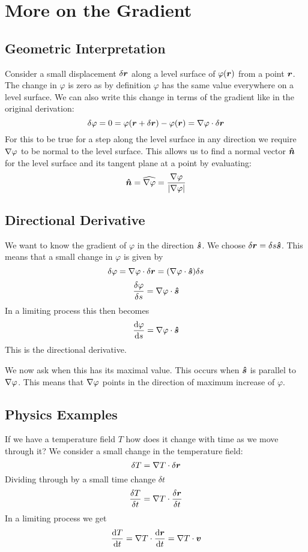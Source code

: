 \documentclass{article}
\begin{document}
    \section{More on the Gradient}
    \subsection{Geometric Interpretation}
    Consider a small displacement \(\delta\bm{r}\) along a level surface of \(\varphi(\bm{r})\) from a point \(\bm{r}\).
    The change in \(\varphi\) is zero as by definition \(\varphi\) has the same value everywhere on a level surface.
    We can also write this change in terms of the gradient like in the original derivation:
    \[\delta\varphi = 0 =\varphi(\bm{r} + \delta\bm{r}) - \varphi(\bm{r}) = \nabla\varphi\cdot\delta\bm{r}\]
    For this to be true for a step along the level surface in any direction we require \(\nabla\varphi\) to be normal to the level surface.
    This allows us to find a normal vector \(\bm{\hat{n}}\) for the level surface and its tangent plane at a point by evaluating:
    \[\bm{\hat{n}} = \widehat{\nabla\varphi} = \frac{\nabla\varphi}{|\nabla\varphi|}\]
    \subsection{Directional Derivative}
    We want to know the gradient of \(\varphi\) in the direction \(\bm{\hat{s}}\).
    We choose \(\delta\bm{r} = \delta s\bm{\hat{s}}\).
    This means that a small change in \(\varphi\) is given by
    \[\delta\varphi = \nabla\varphi\cdot\delta\bm{r} = (\nabla\varphi\cdot\bm{\hat{s}})\delta s\]
    \[\frac{\delta\varphi}{\delta s} = \nabla\varphi\cdot\bm{\hat{s}}\]
    In a limiting process this then becomes
    \[\dv{\varphi}{s} = \nabla{\varphi}\cdot\bm{\hat{s}}\]
    This is the directional derivative.
    
    We now ask when this has its maximal value.
    This occurs when \(\bm{\hat{s}}\) is parallel to \(\nabla\varphi\).
    This means that \(\nabla\varphi\) points in the direction of maximum increase of \(\varphi\).
    
    \subsection{Physics Examples}
    \example
    If we have a temperature field \(T\) how does it change with time as we move through it?
    We consider a small change in the temperature field:
    \[\delta T = \nabla T\cdot\delta\bm{r}\]
    Dividing through by a small time change \(\delta t\)
    \[\frac{\delta T}{\delta t} = \nabla T\cdot\frac{\delta\bm{r}}{\delta t}\]
    In a limiting process we get
    \[\dv{T}{t} = \nabla T\cdot\dv{\bm{r}}{t} = \nabla T\cdot\bm{v}\]
    
\end{document}
